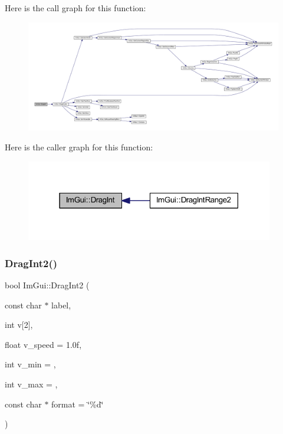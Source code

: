Here is the call graph for this function\+:
\nopagebreak
\begin{figure}[H]
\begin{center}
\leavevmode
\includegraphics[width=350pt]{namespace_im_gui_a202444c7b59820ae0a16d26f4322b4a9_cgraph}
\end{center}
\end{figure}
Here is the caller graph for this function\+:
\nopagebreak
\begin{figure}[H]
\begin{center}
\leavevmode
\includegraphics[width=307pt]{namespace_im_gui_a202444c7b59820ae0a16d26f4322b4a9_icgraph}
\end{center}
\end{figure}
\mbox{\label{namespace_im_gui_a8a1121ff004dbc90c2c81b04e6623429}} 
\subsubsection{\texorpdfstring{Drag\+Int2()}{DragInt2()}}
{\footnotesize\ttfamily bool Im\+Gui\+::\+Drag\+Int2 (\begin{DoxyParamCaption}\item[{const char $\ast$}]{label,  }\item[{int}]{v\mbox{[}2\mbox{]},  }\item[{float}]{v\+\_\+speed = {\ttfamily 1.0f},  }\item[{int}]{v\+\_\+min = {},  }\item[{int}]{v\+\_\+max = {},  }\item[{const char $\ast$}]{format = {\ttfamily \char`\"{}\%d\char`\"{}} }\end{DoxyParamCaption})}

